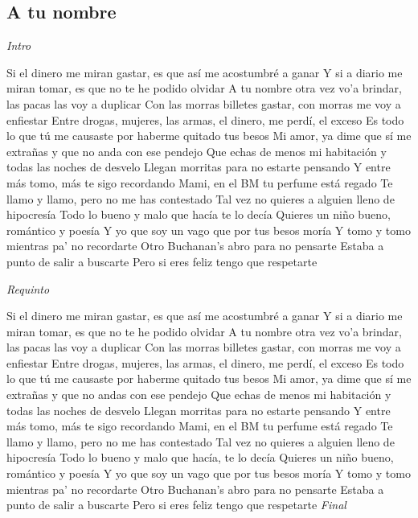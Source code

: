 \subsection{A tu nombre}
\noindent

\vspace{1cm}

\begin{guitar}
	\begin{multicols}{2}

		\textit{Intro}

	Si el dinero me miran gastar, es que así me acostumbré a ganar
	Y si a diario me miran tomar, es que no te he podido olvidar
	A tu nombre otra vez vo'a brindar, las pacas las voy a duplicar
	Con las morras billetes gastar, con morras me voy a enfiestar
	Entre drogas, mujeres, las armas, el dinero, me perdí, el exceso
	Es todo lo que tú me causaste por haberme quitado tus besos
	Mi amor, ya dime que sí me extrañas y que no anda con ese pendejo
	Que echas de menos mi habitación y todas las noches de desvelo
	Llegan morritas para no estarte pensando
	Y entre más tomo, más te sigo recordando
	Mami, en el BM tu perfume está regado
	Te llamo y llamo, pero no me has contestado
	Tal vez no quieres a alguien lleno de hipocresía
	Todo lo bueno y malo que hacía te lo decía
	Quieres un niño bueno, romántico y poesía
	Y yo que soy un vago que por tus besos moría
	Y tomo y tomo mientras pa' no recordarte
	Otro Buchanan's abro para no pensarte
	Estaba a punto de salir a buscarte
	Pero si eres feliz tengo que respetarte
	\par
	\textit{Requinto}

	Si el dinero me miran gastar, es que así me acostumbré a ganar
	Y si a diario me miran tomar, es que no te he podido olvidar
	A tu nombre otra vez vo'a brindar, las pacas las voy a duplicar
	Con las morras billetes gastar, con morras me voy a enfiestar
	Entre drogas, mujeres, las armas, el dinero, me perdí, el exceso
	Es todo lo que tú me causaste por haberme quitado tus besos
	Mi amor, ya dime que sí me extrañas y que no andas con ese pendejo
	Que echas de menos mi habitación y todas las noches de desvelo
	Llegan morritas para no estarte pensando
	Y entre más tomo, más te sigo recordando
	Mami, en el BM tu perfume está regado
	Te llamo y llamo, pero no me has contestado
	Tal vez no quieres a alguien lleno de hipocresía
	Todo lo bueno y malo que hacía, te lo decía
	Quieres un niño bueno, romántico y poesía
	Y yo que soy un vago que por tus besos moría
	Y tomo y tomo mientras pa' no recordarte
	Otro Buchanan's abro para no pensarte
	Estaba a punto de salir a buscarte
	Pero si eres feliz tengo que respetarte
		\textit{Final}
	\end{multicols}
\end{guitar}
